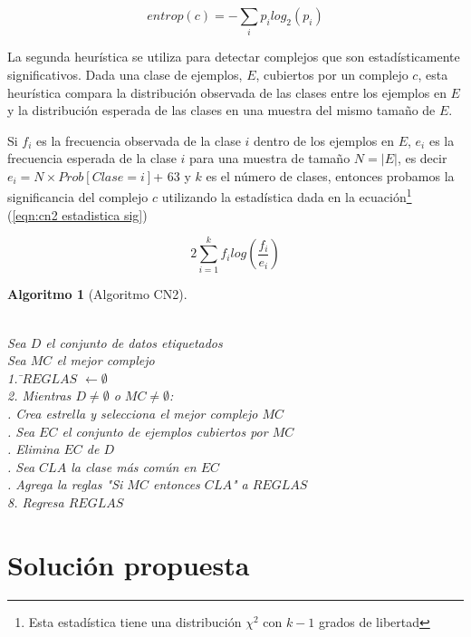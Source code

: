 \documentclass[12pt]{report}
\theoremstyle{break}
\theoremstyle{break}
\newtheorem{algoritmo}{Algoritmo}[chapter]
\begin{document}
\begin{equation} \label{eqn:entropia complejo}
entrop(c) = - \sum_{i} p_i log_{2}(p_{i})
\end{equation}

La segunda heurística se utiliza para detectar complejos que son estadísticamente significativos. Dada una clase de ejemplos, $E$, cubiertos por un complejo $c$, esta heurística compara la distribución observada de las clases entre los ejemplos en $E$ y la distribución esperada de las clases en una muestra del mismo tamaño de $E$.

Si $f_i$ es la frecuencia observada de la clase $i$ dentro de los ejemplos en $E$, $e_{i}$ es la frecuencia esperada de la clase $i$ para una muestra de tamaño $N=\vert E \vert$, es decir $e_i = N \times Prob\left[ Clase = i \right]$+
63 y $k$ es el número de clases, entonces probamos la significancia del complejo $c$ utilizando la estadística dada en la ecuación\footnote{Esta estadística tiene una distribución $\chi^2$ con $k-1$ grados de libertad } (\ref{eqn:cn2 estadistica sig})

\begin{equation} \label{eqn:cn2 estadistica sig}
2 \sum_{i=1}^{k} f_{i} log\left(\frac{f_{i}} {e_{i}} \right)
\end{equation}

\begin{algoritmo}[Algoritmo CN2]
\begin{tabbing}
\\Sea $D$ el conjunto de datos etiquetados
\\Sea $MC$ el mejor complejo\\
1. \=$REGLAS$ $\leftarrow \emptyset $ \\
2. Mientras $D \neq \emptyset$ o $MC \neq \emptyset$:\\
 . Crea estrella y selecciona el mejor complejo $MC$\\
 . Sea $EC$ el conjunto de ejemplos cubiertos por $MC$ \\
 . Elimina $EC$ de $D$\\
 . Sea $CLA$ la clase más común en $EC$\\
 . Agrega la reglas "Si $MC$ entonces $CLA$" a $REGLAS$\\
8. Regresa $REGLAS$
\end{tabbing}
\label{algo:CN2}
\end{algoritmo}

\chapter[Capítulo \thechapter: Solución propuesta]{Solución propuesta}
\label{capitulo:solucion propuesta}
\end{document}

